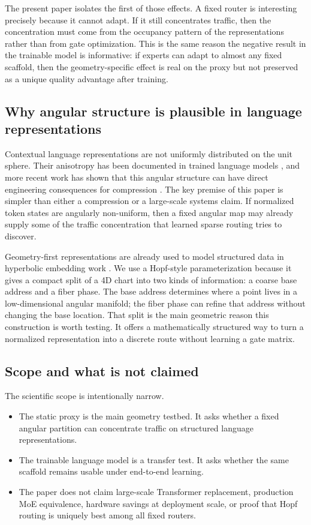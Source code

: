 \documentclass[10pt,letterpaper]{article}
\begin{document}
The present paper isolates the first of those effects. A fixed router is interesting precisely because it cannot adapt. If it still concentrates traffic, then the concentration must come from the occupancy pattern of the representations rather than from gate optimization. This is the same reason the negative result in the trainable model is informative: if experts can adapt to almost any fixed scaffold, then the geometry-specific effect is real on the proxy but not preserved as a unique quality advantage after training.

\subsection{Why angular structure is plausible in language representations}
Contextual language representations are not uniformly distributed on the unit sphere. Their anisotropy has been documented in trained language models \citep{ethayarajh2019anisotropy}, and more recent work has shown that this angular structure can have direct engineering consequences for compression \citep{turboquant2026}. The key premise of this paper is simpler than either a compression or a large-scale systems claim. If normalized token states are angularly non-uniform, then a fixed angular map may already supply some of the traffic concentration that learned sparse routing tries to discover.

Geometry-first representations are already used to model structured data in hyperbolic embedding work \citep{nickel2017poincare, ganea2018hyperbolic}. We use a Hopf-style parameterization because it gives a compact split of a 4D chart into two kinds of information: a coarse base address and a fiber phase. The base address determines where a point lives in a low-dimensional angular manifold; the fiber phase can refine that address without changing the base location. That split is the main geometric reason this construction is worth testing. It offers a mathematically structured way to turn a normalized representation into a discrete route without learning a gate matrix.

\subsection{Scope and what is not claimed}
The scientific scope is intentionally narrow.
\begin{itemize}
\item The static proxy is the main geometry testbed. It asks whether a fixed angular partition can concentrate traffic on structured language representations.
\item The trainable language model is a transfer test. It asks whether the same scaffold remains usable under end-to-end learning.
\item The paper does not claim large-scale Transformer replacement, production MoE equivalence, hardware savings at deployment scale, or proof that Hopf routing is uniquely best among all fixed routers.
\end{itemize}
\end{document}
